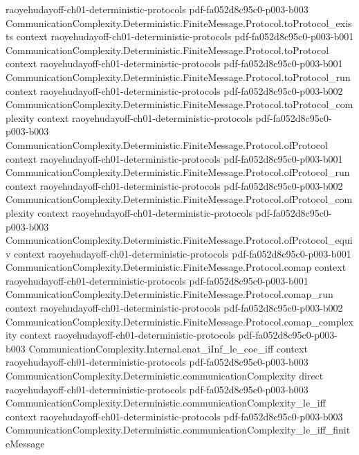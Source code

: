 \begin{theorem}
  {raoyehudayoff-ch01-deterministic-protocols}
  {pdf-fa052d8c95c0-p003-b003}
\proofstep
  {CommunicationComplexity.Deterministic.FiniteMessage.Protocol.toProtocol_exists}
  {context}
  {raoyehudayoff-ch01-deterministic-protocols}
  {pdf-fa052d8c95c0-p003-b001}
\proofstep
  {CommunicationComplexity.Deterministic.FiniteMessage.Protocol.toProtocol}
  {context}
  {raoyehudayoff-ch01-deterministic-protocols}
  {pdf-fa052d8c95c0-p003-b001}
\proofstep
  {CommunicationComplexity.Deterministic.FiniteMessage.Protocol.toProtocol_run}
  {context}
  {raoyehudayoff-ch01-deterministic-protocols}
  {pdf-fa052d8c95c0-p003-b002}
\proofstep
  {CommunicationComplexity.Deterministic.FiniteMessage.Protocol.toProtocol_complexity}
  {context}
  {raoyehudayoff-ch01-deterministic-protocols}
  {pdf-fa052d8c95c0-p003-b003}
\proofstep
  {CommunicationComplexity.Deterministic.FiniteMessage.Protocol.ofProtocol}
  {context}
  {raoyehudayoff-ch01-deterministic-protocols}
  {pdf-fa052d8c95c0-p003-b001}
\proofstep
  {CommunicationComplexity.Deterministic.FiniteMessage.Protocol.ofProtocol_run}
  {context}
  {raoyehudayoff-ch01-deterministic-protocols}
  {pdf-fa052d8c95c0-p003-b002}
\proofstep
  {CommunicationComplexity.Deterministic.FiniteMessage.Protocol.ofProtocol_complexity}
  {context}
  {raoyehudayoff-ch01-deterministic-protocols}
  {pdf-fa052d8c95c0-p003-b003}
\proofstep
  {CommunicationComplexity.Deterministic.FiniteMessage.Protocol.ofProtocol_equiv}
  {context}
  {raoyehudayoff-ch01-deterministic-protocols}
  {pdf-fa052d8c95c0-p003-b001}
\proofstep
  {CommunicationComplexity.Deterministic.FiniteMessage.Protocol.comap}
  {context}
  {raoyehudayoff-ch01-deterministic-protocols}
  {pdf-fa052d8c95c0-p003-b001}
\proofstep
  {CommunicationComplexity.Deterministic.FiniteMessage.Protocol.comap_run}
  {context}
  {raoyehudayoff-ch01-deterministic-protocols}
  {pdf-fa052d8c95c0-p003-b002}
\proofstep
  {CommunicationComplexity.Deterministic.FiniteMessage.Protocol.comap_complexity}
  {context}
  {raoyehudayoff-ch01-deterministic-protocols}
  {pdf-fa052d8c95c0-p003-b003}
\proofstep
  {CommunicationComplexity.Internal.enat_iInf_le_coe_iff}
  {context}
  {raoyehudayoff-ch01-deterministic-protocols}
  {pdf-fa052d8c95c0-p003-b003}
\proofstep
  {CommunicationComplexity.Deterministic.communicationComplexity}
  {direct}
  {raoyehudayoff-ch01-deterministic-protocols}
  {pdf-fa052d8c95c0-p003-b003}
\proofstep
  {CommunicationComplexity.Deterministic.communicationComplexity_le_iff}
  {context}
  {raoyehudayoff-ch01-deterministic-protocols}
  {pdf-fa052d8c95c0-p003-b003}
\proofstep
  {CommunicationComplexity.Deterministic.communicationComplexity_le_iff_finiteMessage}

\end{theorem}
